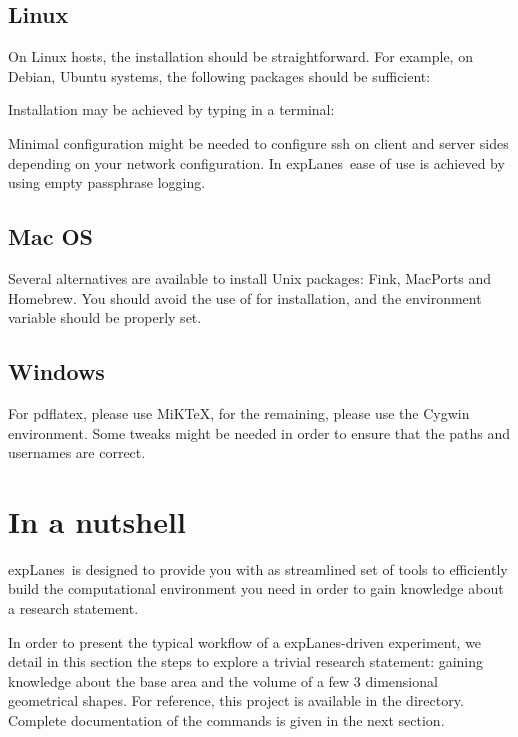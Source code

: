 \documentclass[a4paper,fleqn]{tufte-handout}
\newcommand{\explanes}{\textsf{expLanes}\ }
\begin{document}
\subsection{Linux}

On Linux hosts, the installation should be straightforward. For example, on Debian, Ubuntu systems, the following packages should be sufficient:


Installation may be achieved by typing in a terminal: 


Minimal configuration might be needed to configure ssh on client and server sides depending on your network configuration. In \explanes ease of use is achieved by using empty passphrase logging.

\subsection{Mac OS}

Several alternatives are available to install Unix packages: Fink, MacPorts and Homebrew. You should avoid the use of  for installation, and the  environment variable should be properly set.

\subsection{Windows}

For pdflatex, please use MiKTeX, for the remaining, please use the Cygwin environment. Some tweaks might be needed in order to ensure that the paths and usernames are correct.

\section{In a nutshell}
\hypertarget{nutshell}{}
 
\explanes is designed to provide you with as streamlined set of tools to efficiently build the computational environment you need in order to gain knowledge about a research statement.

In order to present the typical workflow of a \textsf{expLanes}-driven experiment, we detail in this section the steps to explore a trivial research statement: gaining knowledge about the base area and the volume of a few 3 dimensional geometrical shapes. For reference, this project is available in the  directory. Complete documentation of the commands is given in the next section.%
\end{document}
